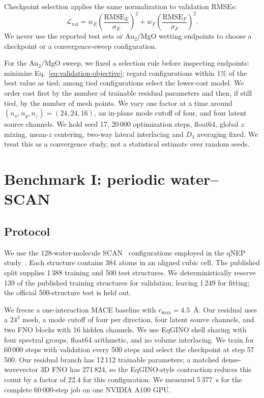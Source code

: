 \documentclass[11pt]{article}
\newcommand{\angstrom}{\ensuremath{\text{\AA}}}
\newcommand{\RMSE}{\ensuremath{\mathrm{RMSE}}}
\begin{document}
Checkpoint selection applies the same normalization to validation RMSEs:
\begin{equation}
 \mathcal L_{\mathrm{val}}=
 w_E\left(\frac{\RMSE_E}{\sigma_E}\right)^2+
 w_F\left(\frac{\RMSE_F}{\sigma_F}\right)^2 .
 \label{eq:validation-objective}
\end{equation}
We never use the reported test sets or Au$_2$/MgO wetting endpoints to choose
a checkpoint or a convergence-sweep configuration.

For the Au$_2$/MgO sweep, we fixed a selection rule before inspecting
endpoints: minimize Eq.~\eqref{eq:validation-objective}; regard configurations
within 1\% of the best value as tied; among tied configurations select the
lower-cost model. We order cost first by the number of trainable residual
parameters and then, if still tied, by the number of mesh points. We vary one
factor at a time around
\((n_x,n_y,n_z)=(24,24,16)\), an in-plane mode cutoff of four, and four latent
source channels. We hold seed 17, 20\,000 optimization steps, float64,
global \(z\) mixing, mean-\(z\) centering, two-way lateral interlacing and \(D_4\)
averaging fixed. We treat this as a convergence study, not a statistical
estimate over random seeds.

\section{Benchmark I: periodic water--SCAN}
\label{sec:water}

\subsection{Protocol}

We use the 128-water-molecule SCAN~\citep{sun2015scan} configurations employed
in the qNEP study~\citep{fan2026qnep}. Each structure contains 384 atoms in an
aligned cubic cell. The published split supplies 1\,388 training and 500 test
structures. We deterministically reserve 139 of the published training
structures for validation, leaving 1\,249 for fitting; the official
500-structure test is held out.

We freeze a one-interaction MACE baseline with \(r_{\max}=4.5\)~\angstrom.
Our residual uses a \(24^3\) mesh, a mode cutoff of four per direction, four
latent source channels, and two FNO blocks with 16 hidden channels. We use
EqGINO shell sharing with four spectral groups, float64 arithmetic, and no
volume interlacing.
We train for 60\,000 steps with validation every 500 steps and select the
checkpoint at step 57\,500. Our residual branch has 12\,112 trainable
parameters; a matched dense-wavevector 3D FNO has 271\,824, so the
EqGINO-style contraction reduces this count by a factor of 22.4 for this
configuration.
We measured 5\,377~s for the complete 60\,000-step job on one NVIDIA A100 GPU.
\end{document}
